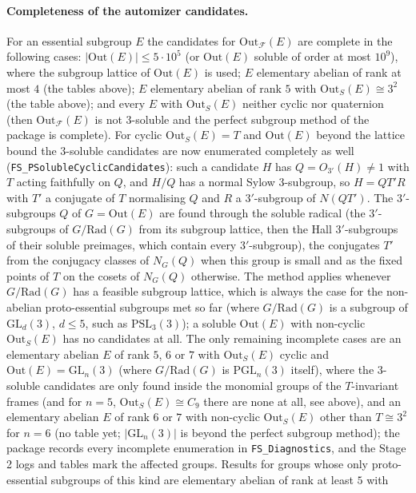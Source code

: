 \documentclass[11pt]{article}
\theoremstyle{definition}
\theoremstyle{remark}
\newcommand{\F}{\mathcal{F}}
\newcommand{\Out}{\mathrm{Out}}
\newcommand{\GL}{\mathrm{GL}}
\newcommand{\PSL}{\mathrm{PSL}}
\newcommand{\PGL}{\mathrm{PGL}}
\begin{document}
\paragraph{Completeness of the automizer candidates.}  For an essential
subgroup $E$ the candidates for $\Out_\F(E)$ are complete in the following
cases: $|\Out(E)|\le 5\cdot10^5$ (or $\Out(E)$ soluble of order at most
$10^9$), where the subgroup lattice of $\Out(E)$ is used; $E$ elementary
abelian of rank at most $4$ (the tables above); $E$ elementary abelian of
rank $5$ with $\Out_S(E)\cong3^2$ (the table above); and every $E$ with
$\Out_S(E)$ neither cyclic nor quaternion (then $\Out_\F(E)$ is not
$3$-soluble and the perfect subgroup method of the package is complete).
For cyclic $\Out_S(E)=T$ and $\Out(E)$ beyond the lattice bound the
$3$-soluble candidates are now enumerated completely as well
(\texttt{FS\_PSolubleCyclicCandidates}): such a candidate $H$ has
$Q=O_{3'}(H)\ne1$ with $T$ acting faithfully on $Q$, and $H/Q$ has a
normal Sylow $3$-subgroup, so $H=QT'R$ with $T'$ a conjugate of $T$
normalising $Q$ and $R$ a $3'$-subgroup of $N(QT')$.  The $3'$-subgroups
$Q$ of $G=\Out(E)$ are found through the soluble radical (the $3'$-subgroups
of $G/\mathrm{Rad}(G)$ from its subgroup lattice, then the Hall
$3'$-subgroups of their soluble preimages, which contain every $3'$-subgroup),
the conjugates $T'$ from the conjugacy classes of $N_G(Q)$ when this group
is small and as the fixed points of $T$ on the cosets of $N_G(Q)$
otherwise.  The method applies whenever $G/\mathrm{Rad}(G)$ has a feasible
subgroup lattice, which is always the case for the non-abelian
proto-essential subgroups met so far (where $G/\mathrm{Rad}(G)$ is a
subgroup of $\GL_d(3)$, $d\le5$, such as $\PSL_3(3)$); a soluble $\Out(E)$
with non-cyclic $\Out_S(E)$ has no candidates at all.  The only remaining
incomplete cases are an elementary abelian $E$ of rank $5$, $6$ or $7$ with
$\Out_S(E)$ cyclic and $\Out(E)=\GL_n(3)$ (where $G/\mathrm{Rad}(G)$ is
$\PGL_n(3)$ itself), where the $3$-soluble candidates are only found
inside the monomial groups of the $T$-invariant frames (and for $n=5$,
$\Out_S(E)\cong C_9$ there are none at all, see above), and an elementary
abelian $E$ of rank $6$ or $7$ with non-cyclic $\Out_S(E)$ other than
$T\cong3^2$ for $n=6$ (no table yet; $|\GL_n(3)|$ is beyond the perfect
subgroup method); the package records every incomplete enumeration in
\texttt{FS\_Diagnostics}, and the Stage 2 logs and tables mark the
affected groups.  Results for groups whose only proto-essential
subgroups of this kind are elementary abelian of rank at least $5$ with
\end{document}
